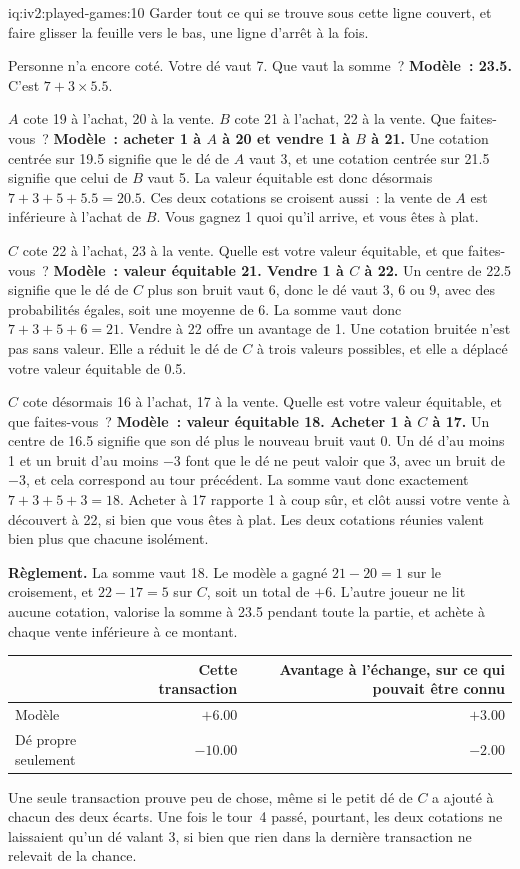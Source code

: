\begin{solution}{iq:iv2:played-games:10}
Garder tout ce qui se trouve sous cette ligne couvert, et faire glisser la feuille vers le bas, une ligne d'arrêt à la fois.

Personne n'a encore coté. Votre dé vaut 7. Que vaut la somme~?
\ivstop
\textbf{Modèle~: 23.5.} C'est $7 + 3 \times 5.5$.

$A$ cote 19 à l'achat, 20 à la vente. $B$ cote 21 à l'achat, 22 à la vente. Que faites-vous~?
\ivstop
\textbf{Modèle~: acheter 1 à $A$ à 20 et vendre 1 à $B$ à 21.} Une cotation centrée sur 19.5 signifie que le dé de $A$ vaut 3, et une cotation centrée sur 21.5 signifie que celui de $B$ vaut 5. La valeur équitable est donc désormais $7 + 3 + 5 + 5.5 = 20.5$. Ces deux cotations se croisent aussi~: la vente de $A$ est inférieure à l'achat de $B$. Vous gagnez 1 quoi qu'il arrive, et vous êtes à plat.

$C$ cote 22 à l'achat, 23 à la vente. Quelle est votre valeur équitable, et que faites-vous~?
\ivstop
\textbf{Modèle~: valeur équitable 21. Vendre 1 à $C$ à 22.} Un centre de 22.5 signifie que le dé de $C$ plus son bruit vaut 6, donc le dé vaut 3, 6 ou 9, avec des probabilités égales, soit une moyenne de 6. La somme vaut donc $7 + 3 + 5 + 6 = 21$. Vendre à 22 offre un avantage de 1. Une cotation bruitée n'est pas sans valeur. Elle a réduit le dé de $C$ à trois valeurs possibles, et elle a déplacé votre valeur équitable de 0.5.

$C$ cote désormais 16 à l'achat, 17 à la vente. Quelle est votre valeur équitable, et que faites-vous~?
\ivstop
\textbf{Modèle~: valeur équitable 18. Acheter 1 à $C$ à 17.} Un centre de 16.5 signifie que son dé plus le nouveau bruit vaut 0. Un dé d'au moins 1 et un bruit d'au moins $-3$ font que le dé ne peut valoir que 3, avec un bruit de $-3$, et cela correspond au tour précédent. La somme vaut donc exactement $7 + 3 + 5 + 3 = 18$. Acheter à 17 rapporte 1 à coup sûr, et clôt aussi votre vente à découvert à 22, si bien que vous êtes à plat. Les deux cotations réunies valent bien plus que chacune isolément.

\medskip
\textbf{Règlement.} La somme vaut 18. Le modèle a gagné $21 - 20 = 1$ sur le croisement, et $22 - 17 = 5$ sur $C$, soit un total de $+6$. L'autre joueur ne lit aucune cotation, valorise la somme à 23.5 pendant toute la partie, et achète à chaque vente inférieure à ce montant.
\begin{center}\small
\begin{tabular}{@{}lrr@{}}
 & Cette transaction & Avantage à l'échange, sur ce qui pouvait être connu \\ \hline
Modèle & $+6.00$ & $+3.00$ \\
Dé propre seulement & $-10.00$ & $-2.00$
\end{tabular}
\end{center}
Une seule transaction prouve peu de chose, même si le petit dé de $C$ a ajouté à chacun des deux écarts. Une fois le tour~4 passé, pourtant, les deux cotations ne laissaient qu'un dé valant 3, si bien que rien dans la dernière transaction ne relevait de la chance.


\end{solution}
